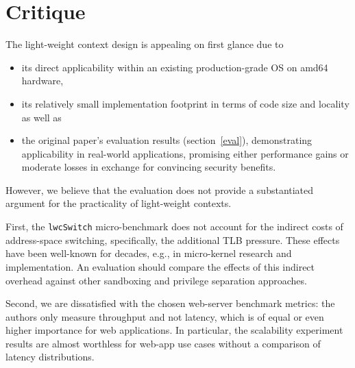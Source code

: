 \documentclass[10pt,twocolumn,a4paper]{article}
\begin{document}
\section{Critique}\label{eval:crit}
The light-weight context design is appealing on first glance due to
\begin{itemize}[nosep]
  \item its direct applicability within an existing production-grade OS on amd64 hardware,
  \item its relatively small implementation footprint in terms of code size and locality as well as
  \item the original paper's evaluation results (section~\ref{eval}), demonstrating applicability in real-world applications, promising either performance gains or moderate losses in exchange for convincing security benefits.
\end{itemize}
However, we believe that the evaluation does not provide a substantiated argument for the practicality of light-weight contexts.

First, the \lstinline{lwcSwitch} micro-benchmark does not account for the indirect costs of address-space switching, specifically, the additional TLB pressure.
These effects have been well-known for decades, e.g., in micro-kernel research  and implementation. \cite{liedtke1997achievedipcperformance} 
An evaluation should compare the effects of this indirect overhead against other sandboxing and privilege separation approaches.

Second, we are dissatisfied with the chosen web-server benchmark metrics:
the authors only measure throughput and not latency, which is of equal or even higher importance for web applications.
In particular, the scalability experiment results are almost worthless for web-app use cases without a comparison of latency distributions.
\end{document}
